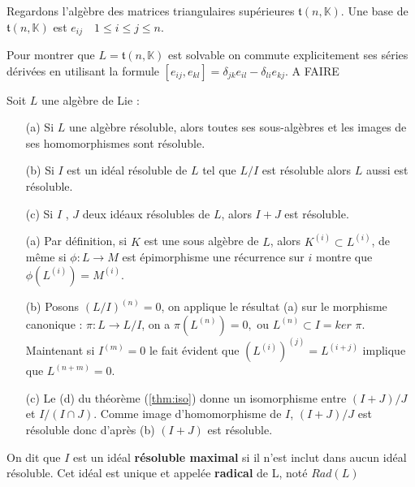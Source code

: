 \documentclass[a4paper,openany,12pt]{report}
\newcommand{\KK}{\mathbb{K}}
\newcommand{\ttt}{\mathfrak{t}}
\theoremstyle{break}
{\theorembodyfont{\upshape}
\newtheorem*{rmq}{Remarque :}
\newtheorem*{prv}{Preuve :}
\newtheorem*{ex}{Exemples :}
\newtheorem{exe}{Exemple : }
\newtheorem*{nota}{Notation :}}
\begin{document}
\begin{ex}
\quad Regardons l'algèbre des matrices triangulaires supérieures $\ttt(n,\KK)$. Une base de $\ttt(n,\KK)$ est $e_{ij}\quad1\leq i \leq j\leq n$.

Pour montrer que $L = \ttt(n,\KK)$  est solvable on commute explicitement ses séries dérivées en utilisant la formule $ [ e_{ij},e_{kl} ]  = \delta_{jk}e_{il}  -  \delta_{li}e_{kj} $.
A FAIRE 
\end{ex}

\begin{prop}\label{prop:solv}
Soit $L$ une algèbre de Lie :
\begin{itemize}
\item[(a)] Si $L$ une algèbre résoluble, alors toutes ses sous-algèbres et les images de ses homomorphismes sont résoluble.
\item[(b)] Si $I$ est un idéal résoluble de $L$ tel que $L/I$ est résoluble alors $L$ aussi est résoluble.
\item[(c)] Si $I$ , $J$ deux idéaux résolubles de $L$, alors $I+J$ est résoluble.
\end{itemize}
\end{prop}

\begin{prv}
\begin{enumerate}
\item[(a)] Par définition, si $K$ est une sous algèbre de $L$, alors $K^{(i)} \subset L^{(i)}$, de même si $\phi: L \rightarrow M$ est épimorphisme une récurrence sur $i$ montre que $\phi\left(L^{(i)}\right)=M^{(i)}$.
\item[(b)] Posons $(L / I)^{(n)}=0$, on applique le résultat (a) sur le morphisme canonique : $\pi: L \rightarrow L / I$, on a  $\pi\left(L^{(n)}\right)=0,$ ou  $L^{(n)} \subset I= ker$ $\pi$. Maintenant si  $I^{(m)}=0$ le fait évident que $\left(L^{(i)}\right)^{(j)}=L^{(i+j)}$ implique que  $L^{(n+m)}=0$. 
\item[(c)] Le (d) du théorème (\ref{thm:iso}) donne un isomorphisme entre $(I+J) / J$ et $I /(I \cap J)$. Comme image d'homomorphisme de $I$, $(I+J) / J$  est résoluble donc d'après (b)  $(I+J)$ est résoluble.
\end{enumerate}
\end{prv}

\begin{df}
\quad On dit que $I$ est un idéal \textbf{résoluble maximal} si il n'est inclut dans aucun idéal résoluble. Cet idéal est unique et appelée \textbf{radical} de L, noté $Rad(L)$
\end{df}
\end{document}
